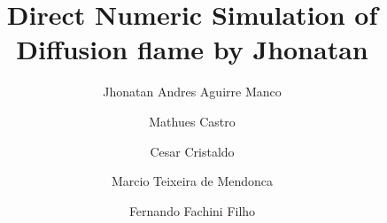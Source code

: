 \documentclass[preprint,12pt,authoryear]{elsarticle}
\begin{document}

\begin{frontmatter}



\title{Direct Numeric Simulation of Diffusion flame by Jhonatan}



\author{Jhonatan Andres Aguirre Manco}

\author{Mathues Castro}
\author{Cesar Cristaldo}
\author{Marcio Teixeira de Mendonca}
\author{Fernando Fachini Filho}


%
\begin{abstract}
\end{abstract}


\end{frontmatter}
\end{document}
